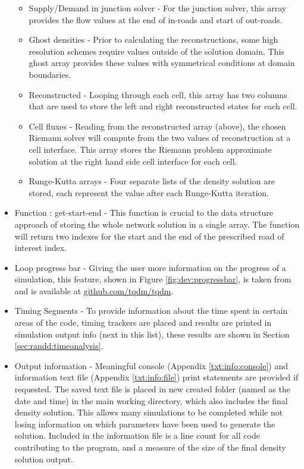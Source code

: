 \begin{itemize}
\begin{itemize}
			\item Supply/Demand in junction solver - For the junction solver, this array provides the flow values at the end of in-roads and start of out-roads.
			\item Ghost densities - Prior to calculating the reconstructions, some high resolution schemes require values outside of the solution domain. This ghost array provides these values with symmetrical conditions at domain boundaries.
			\item Reconstructed - Looping through each cell, this array has two columns that are used to store the left and right reconstructed states for each cell.
			\item Cell fluxes - Reading from the reconstructed array (above), the chosen Riemann solver will compute from the two values of reconstruction at a cell interface. This array stores the Riemann problem approximate solution at the right hand side cell interface for each cell.
			\item Runge-Kutta arrays - Four separate lists of the density solution are stored, each represent the value after each Runge-Kutta iteration.
		\end{itemize}
		\item Function : get-start-end - This function is crucial to the data structure approach of storing the whole network solution in a single array. The function will return two indexes for the start and the end of the prescribed road of interest index.
		\item Loop progress bar - Giving the user more information on the progress of a simulation, this feature, shown in Figure \ref{fig:dev:progressbar}, is taken from \cite{TQDM} and is available at \href{https://github.com/tqdm/tqdm}{github.com/tqdm/tqdm}.
		\item Timing Segments - To provide information about the time spent in certain areas of the code, timing trackers are placed and results are printed in simulation output info (next in this list), these results are shown in Section \ref{sec:randd:timeanalysis}.
		\item Output information - Meaningful console (Appendix \ref{txt:info:console}) and information text file (Appendix \ref{txt:info:file}) print statements are provided if requested. The saved text file is placed in new created folder (named as the date and time) in the main working directory, which also includes the final density solution. This allows many simulations to be completed while not losing information on which parameters have been used to generate the solution. Included in the information file is a line count for all code contributing to the program, and a measure of the size of the final density solution output.
	\end{itemize}
	

